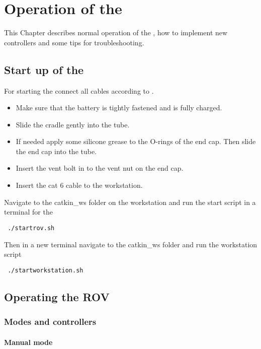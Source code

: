 \chapter{Operation of the \abbrROV} \label{app:operation}
This Chapter describes normal operation of the \abbrROV, how to implement new controllers and some tips for troubleshooting.
 
\section{Start up of the \abbrROV}
For starting the \abbrROV connect all cables according to .
\begin{itemize}
	\item Make sure that the battery is tightly fastened and is fully charged. 
	\item Slide the cradle gently into the \abbrROV tube. 
	\item If needed apply some silicone grease to the O-rings of the end cap. Then slide the end cap into the \abbrROV tube.
	\item Insert the vent bolt in to the vent nut on the end cap.
	\item Insert the cat 6 cable to the workstation.
 \end{itemize} 
Navigate to the catkin\_ws folder on the workstation and run the start script in a terminal for the \abbrROV
\begin{lstlisting}
 ./startrov.sh
\end{lstlisting}
Then in a new terminal navigate to the catkin\_ws folder and run the workstation script
\begin{lstlisting}
 ./startworkstation.sh
\end{lstlisting} 
\section{Operating the ROV}

\subsection{Modes and controllers}

\subsubsection{Manual mode}

